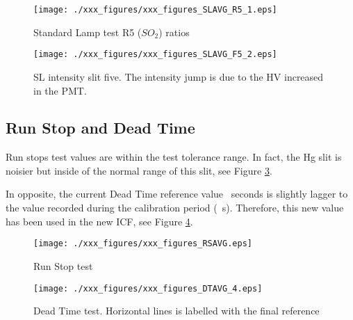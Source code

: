 \begin{figure}[hbtp!]
\begin{center}
     \texttt{[image: ./xxx\_figures/xxx\_figures\_SLAVG\_R5\_1.eps]}
     \caption{Standard Lamp test R5 ($SO_2$) ratios}
	   \label{fig:SLAVG_R5}
\end{center}
\end{figure}
\begin{figure}[hbtp!]
\begin{center}
     \texttt{[image: ./xxx\_figures/xxx\_figures\_SLAVG\_F5\_2.eps]}
     \caption{SL intensity slit five. The intensity jump is due to the HV increased in the PMT.}
	   \label{fig:SLAVG_F5}
\end{center}
\end{figure}

\newpage
\subsection{Run Stop and Dead Time} \label{subsec:DT}

Run stops test values are within the test tolerance range. In fact, the Hg slit  is noisier but inside of the normal range of this slit, see Figure \ref{fig:RSAVG}. 

In opposite, the current Dead Time reference value \textbf{\DTorig}\ seconds is slightly lagger to the value recorded during the calibration period (\textbf{\DTAVG}\ s). Therefore, this new value has been used in the new ICF, see Figure \ref{fig:DTAVG}.
\begin{figure}[hbtp!]
\begin{center}
\texttt{[image: ./xxx\_figures/xxx\_figures\_RSAVG.eps]}
           \caption{Run Stop test}
	         \label{fig:RSAVG}
\end{center}
\end{figure}

\begin{figure}[hbtp!]
\begin{center}
\texttt{[image: ./xxx\_figures/xxx\_figures\_DTAVG\_4.eps]}
           \caption{Dead Time test. Horizontal lines is labelled with the final reference}
	         \label{fig:DTAVG}
\end{center}
\end{figure}


